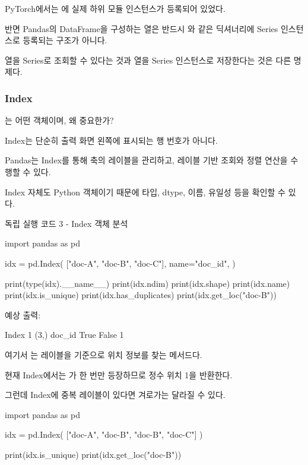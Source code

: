 PyTorch에서는 에 실제 하위 모듈 인스턴스가 등록되어 있었다.

반면 Pandas의 DataFrame을 구성하는 열은 반드시 와 같은 딕셔너리에 Series 인스턴스로 등록되는 구조가 아니다.

열을 Series로 조회할 수 있다는 것과 열을 Series 인스턴스로 저장한다는 것은 다른 명제다.

\subsubsection{Index}는 어떤 객체이며, 왜 중요한가?

Index는 단순히 출력 화면 왼쪽에 표시되는 행 번호가 아니다.

Pandas는 Index를 통해 축의 레이블을 관리하고, 레이블 기반 조회와 정렬 연산을 수행할 수 있다.

Index 자체도 Python 객체이기 때문에 타입, dtype, 이름, 유일성 등을 확인할 수 있다.

\begin{dhknote}
\begin{dhksmry}[centered]
독립 실행 코드 3 - Index 객체 분석
\end{dhksmry}
\end{dhknote}

\begin{dhkcode}
import pandas as pd

idx = pd.Index(
    ["doc-A", "doc-B", "doc-C"],
    name="doc_id",
)

print(type(idx).__name__)
print(idx.ndim)
print(idx.shape)
print(idx.name)
print(idx.is_unique)
print(idx.has_duplicates)
print(idx.get_loc("doc-B"))
\end{dhkcode}

예상 출력:

\begin{dhkzsh}
Index
1
(3,)
doc_id
True
False
1
\end{dhkzsh}

여기서 는 레이블을 기준으로 위치 정보를 찾는 메서드다.

현재 Index에서는 가 한 번만 등장하므로 정수 위치 1을 반환한다.

그런데 Index에 중복 레이블이 있다면 겨로가는 달라질 수 있다.

\begin{dhkcode}
import pandas as pd

idx = pd.Index(
    ["doc-A", "doc-B", "doc-B", "doc-C"]
)

print(idx.is_unique)
print(idx.get_loc("doc-B"))
\end{dhkcode}

